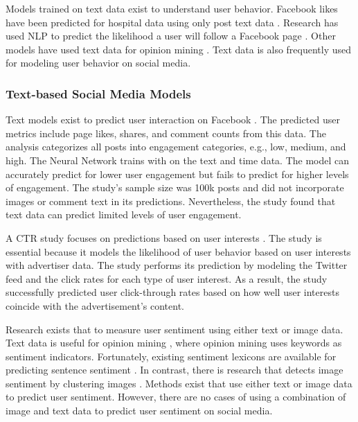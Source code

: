 \documentclass[mksc,blindrev]{informs3} %
\begin{document}
Models trained on text data exist to understand user behavior. Facebook likes have been predicted for hospital data using only post text data \cite{8029313}. Research has used NLP to predict the likelihood a user will follow a Facebook page \cite{Ohsawa2013}. Other models have used text data for opinion mining \cite{Liu2012}. Text data is also frequently used for modeling user behavior on social media.

\subsubsection{Text-based Social Media Models}
Text models exist to predict user interaction on Facebook \cite{8029313}. The predicted user metrics include page likes, shares, and comment counts from this data. The analysis categorizes all posts into engagement categories, e.g., low, medium, and high.  The Neural Network trains with on the text and time data. The model can accurately predict for lower user engagement but fails to predict for higher levels of engagement. The study's sample size was 100k posts and did not incorporate images or comment text in its predictions. Nevertheless, the study found that text data can predict limited levels of user engagement.

A CTR study focuses on predictions based on user interests \cite{Li2015}. The study is essential because it models the likelihood of user behavior based on user interests with advertiser data.  The study performs its prediction by modeling the Twitter feed and the click rates for each type of user interest. As a result, the study successfully predicted user click-through rates based on how well user interests coincide with the advertisement's content.

Research exists that to measure user sentiment using either text or image data. Text data is useful for opinion mining \cite{Liu2012}, where opinion mining uses keywords as sentiment indicators. Fortunately, existing sentiment lexicons are available for predicting sentence sentiment \cite{Georgiou2015}. In contrast, there is research that detects image sentiment by clustering images \cite{Wang2015}. Methods exist that use either text or image data to predict user sentiment. However, there are no cases of using a combination of image and text data to predict user sentiment on social media.
\end{document}
